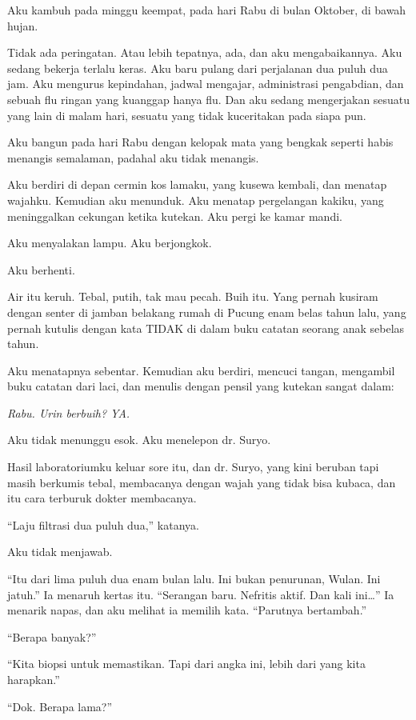 \documentclass[11pt,twoside,openany]{book}
\makeatletter
\newcommand{\scenebreak}{\par\vspace{0.9em}{\centering\textsc{*\hspace{0.7em}*\hspace{0.7em}*}\par}\vspace{0.9em}\@afterindentfalse\@afterheading}
\makeatother
\begin{document}
\scenebreak
Aku kambuh pada minggu keempat, pada hari Rabu di bulan Oktober, di bawah hujan.

Tidak ada peringatan. Atau lebih tepatnya, ada, dan aku mengabaikannya. Aku sedang bekerja terlalu keras. Aku baru pulang dari perjalanan dua puluh dua jam. Aku mengurus kepindahan, jadwal mengajar, administrasi pengabdian, dan sebuah flu ringan yang kuanggap hanya flu. Dan aku sedang mengerjakan sesuatu yang lain di malam hari, sesuatu yang tidak kuceritakan pada siapa pun.

Aku bangun pada hari Rabu dengan kelopak mata yang bengkak seperti habis menangis semalaman, padahal aku tidak menangis.

Aku berdiri di depan cermin kos lamaku, yang kusewa kembali, dan menatap wajahku. Kemudian aku menunduk. Aku menatap pergelangan kakiku, yang meninggalkan cekungan ketika kutekan. Aku pergi ke kamar mandi.

Aku menyalakan lampu. Aku berjongkok.

Aku berhenti.

Air itu keruh. Tebal, putih, tak mau pecah. Buih itu. Yang pernah kusiram dengan senter di jamban belakang rumah di Pucung enam belas tahun lalu, yang pernah kutulis dengan kata TIDAK di dalam buku catatan seorang anak sebelas tahun.

Aku menatapnya sebentar. Kemudian aku berdiri, mencuci tangan, mengambil buku catatan dari laci, dan menulis dengan pensil yang kutekan sangat dalam:

\emph{Rabu. Urin berbuih? YA.}

Aku tidak menunggu esok. Aku menelepon dr. Suryo.

\scenebreak
Hasil laboratoriumku keluar sore itu, dan dr. Suryo, yang kini beruban tapi masih berkumis tebal, membacanya dengan wajah yang tidak bisa kubaca, dan itu cara terburuk dokter membacanya.

``Laju filtrasi dua puluh dua,'' katanya.

Aku tidak menjawab.

``Itu dari lima puluh dua enam bulan lalu. Ini bukan penurunan, Wulan. Ini jatuh.'' Ia menaruh kertas itu. ``Serangan baru. Nefritis aktif. Dan kali ini\ldots{}'' Ia menarik napas, dan aku melihat ia memilih kata. ``Parutnya bertambah.''

``Berapa banyak?''

``Kita biopsi untuk memastikan. Tapi dari angka ini, lebih dari yang kita harapkan.''

``Dok. Berapa lama?''
\end{document}
